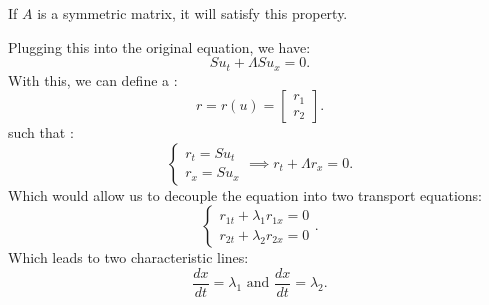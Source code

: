 \documentclass[../main/main.tex]{subfiles}
\begin{document}
\begin{remark} 
If  $A$ is a symmetric matrix, it will satisfy this property.
\end{remark}
Plugging this into the original  equation, we have: \[
S u_t + \Lambda S u_x = 0
.\] 
With this, we can define a : \[
    r = r(u) = \begin{bmatrix} r_1 \\ r_2 \end{bmatrix} 
.\] such that : \[
\begin{cases}
    r_t = Su_t \\
    r_x = S u_x
\end{cases} \implies r_t + \Lambda r_x = 0
.\] Which would allow us to decouple the equation into two transport equations: \[
\begin{cases} 
r_{1t} + \lambda_1  r_{1 x} = 0 \\
r_{2t} + \lambda_2  r_{2 x} = 0
\end{cases}
.\] 
Which leads to two characteristic lines: \[
\frac{dx}{dt} = \lambda_1 \text{ and } \frac{dx}{dt} = \lambda_2
.\] 
\end{document}
